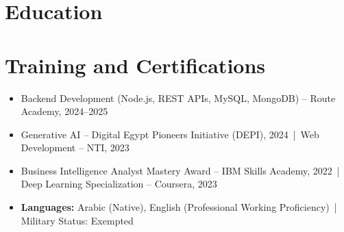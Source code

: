 \section{Education}

\section{Training and Certifications}
\begin{itemize}
  \item Backend Development (Node.js, REST APIs, MySQL, MongoDB) -- Route Academy, 2024--2025
  \item Generative AI -- Digital Egypt Pioneers Initiative (DEPI), 2024 \,|\, Web Development -- NTI, 2023
  \item Business Intelligence Analyst Mastery Award -- IBM Skills Academy, 2022 \,|\, Deep Learning Specialization -- Coursera, 2023
  \item \textbf{Languages:} Arabic (Native), English (Professional Working Proficiency) \,|\, Military Status: Exempted
\end{itemize}


